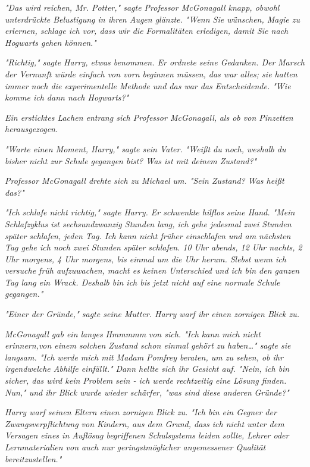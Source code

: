 {\emph{"Das wird reichen, Mr. Potter," sagte Professor McGonagall knapp, obwohl unterdrückte Belustigung in ihren Augen glänzte. "Wenn Sie wünschen, Magie zu erlernen, schlage ich vor, dass wir die Formalitäten erledigen, damit Sie nach Hogwarts gehen können."}

\emph{"Richtig," sagte Harry, etwas benommen. Er ordnete seine Gedanken. Der} \emph{Marsch der Vernunft würde einfach von vorn beginnen müssen, das war alles; sie hatten immer noch die experimentelle Methode und das war das Entscheidende. "Wie komme ich dann nach Hogwarts?"}

\emph{Ein ersticktes Lachen entrang sich Professor McGonagall,} \emph{als ob von Pinzetten herausgezogen.}

\emph{"Warte einen Moment, Harry," sagte sein Vater. "Weißt du noch, weshalb du bisher nicht zur Schule gegangen bist? Was ist mit deinem Zustand?"}

\emph{Professor McGonagall drehte sich zu Michael um. "Sein Zustand? Was heißt das?"}

\emph{"Ich schlafe nicht richtig," sagte Harry. Er schwenkte hilflos seine Hand. "Mein Schlafzyklus ist sechsundzwanzig Stunden lang, ich gehe jedesmal zwei Stunden später schlafen, jeden Tag. Ich kann nicht früher einschlafen und am nächsten Tag gehe ich noch zwei Stunden später schlafen. 10 Uhr abends, 12 Uhr nachts, 2 Uhr morgens, 4 Uhr morgens, bis einmal um die Uhr herum. Slebst wenn ich versuche früh aufzuwachen, macht es keinen Unterschied und ich bin den ganzen Tag lang ein Wrack. Deshalb bin ich bis jetzt nicht auf eine normale Schule gegangen."}

\emph{"Einer der Gründe," sagte seine Mutter. Harry warf ihr einen zornigen Blick zu.}

\emph{McGonagall gab ein langes} \emph{\emph{Hmmmmm}} \emph{von sich. "Ich kann mich nicht erinnern,von einem solchen Zustand schon einmal gehört zu haben…" sagte sie langsam. "Ich werde mich mit Madam Pomfrey beraten, um zu sehen, ob ihr irgendwelche Abhilfe einfällt." Dann hellte sich ihr Gesicht auf. "Nein, ich bin sicher, das wird kein Problem sein - ich werde rechtzeitig eine Lösung finden. Nun," und ihr Blick wurde wieder schärfer, "was sind diese} \emph{\emph{anderen}} \emph{Gründe?"}

\emph{Harry warf seinen Eltern einen zornigen Blick zu. "Ich bin ein Gegner der Zwangsverpflichtung von Kindern, aus dem Grund, dass ich nicht unter dem Versagen eines in Auflösug begriffenen Schulsystems leiden sollte, Lehrer oder Lernmaterialien von auch nur geringstmöglicher angemessener Qualität bereitzustellen."}

}
